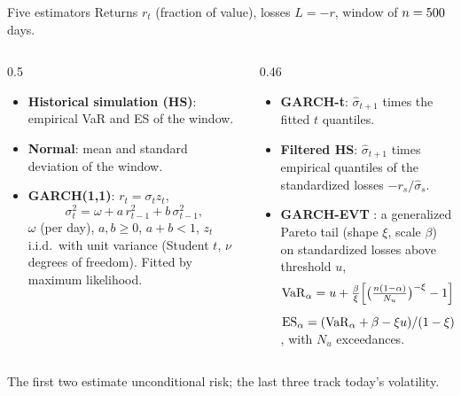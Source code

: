 \documentclass[aspectratio=169,10pt]{beamer}
\begin{document}
\begin{frame}{Five estimators}
  \small
  Returns $r_t$ (fraction of value), losses $L = -r$, window of $n = 500$ days.
  \begin{columns}[T]
    \begin{column}{0.5\textwidth}
      \begin{itemize}
        \item \textbf{Historical simulation (HS)}: empirical VaR and ES of the window.
        \item \textbf{Normal}: mean and standard deviation of the window.
        \item \textbf{GARCH(1,1)}: $r_t = \sigma_t z_t$,
        \[ \sigma_t^2 = \omega + a\,r_{t-1}^2 + b\,\sigma_{t-1}^2, \]
        $\omega$ (per day), $a, b \ge 0$, $a + b < 1$, $z_t$ i.i.d.\ with unit variance (Student $t$, $\nu$ degrees of freedom). Fitted by maximum likelihood.
      \end{itemize}
    \end{column}
    \begin{column}{0.46\textwidth}
      \begin{itemize}
        \item \textbf{GARCH-t}: $\hat\sigma_{t+1}$ times the fitted $t$ quantiles.
        \item \textbf{Filtered HS}: $\hat\sigma_{t+1}$ times empirical quantiles of the standardized losses $-r_s/\hat\sigma_s$.
        \item \textbf{GARCH-EVT} \citep{mcneil2000estimation}: a generalized Pareto tail (shape $\xi$, scale $\beta$) on standardized losses above threshold $u$,
        \[ \mathrm{VaR}_\alpha = u + \tfrac{\beta}{\xi}\Big[\big(\tfrac{n(1-\alpha)}{N_u}\big)^{-\xi} - 1\Big], \]
        $\mathrm{ES}_\alpha = (\mathrm{VaR}_\alpha + \beta - \xi u)/(1-\xi)$, with $N_u$ exceedances.
      \end{itemize}
    \end{column}
  \end{columns}
  \vspace{0.2em}
  \footnotesize The first two estimate unconditional risk; the last three track today's volatility.
\end{frame}
\end{document}
